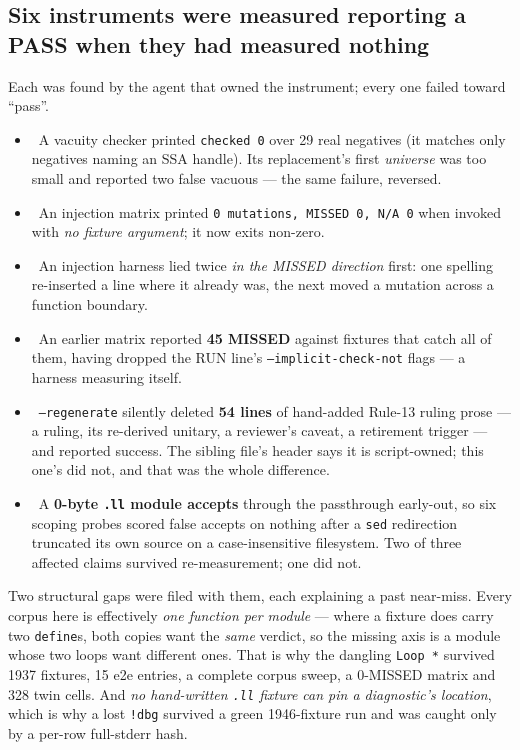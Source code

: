 \subsection*{Six instruments were measured reporting a PASS when they had measured nothing}
Each was found by the agent that owned the instrument; every one failed toward ``pass''.
\begin{itemize}
  \item \fdoc\ A vacuity checker printed \texttt{checked 0} over 29 real negatives (it matches only
    negatives naming an SSA handle). Its replacement's first \emph{universe} was too small and reported two
    false vacuous --- the same failure, reversed.
  \item \fdoc\ An injection matrix printed \texttt{0 mutations, MISSED 0, N/A 0} when invoked with \emph{no
    fixture argument}; it now exits non-zero.
  \item \fdoc\ An injection harness lied twice \emph{in the MISSED direction} first: one spelling
    re-inserted a line where it already was, the next moved a mutation across a function boundary.
  \item \fdoc\ An earlier matrix reported \textbf{45 MISSED} against fixtures that catch all of them,
    having dropped the RUN line's \texttt{--implicit-check-not} flags --- a harness measuring itself.
  \item \fdoc\ \texttt{--regenerate} silently deleted \textbf{54 lines} of hand-added Rule-13 ruling prose
    --- a ruling, its re-derived unitary, a reviewer's caveat, a retirement trigger --- and reported
    success. The sibling file's header says it is script-owned; this one's did not, and that was the whole
    difference.
  \item \fdoc\ A \textbf{0-byte \texttt{.ll} module accepts} through the passthrough early-out, so six
    scoping probes scored false accepts on nothing after a \texttt{sed} redirection truncated its own source
    on a case-insensitive filesystem. Two of three affected claims survived re-measurement; one did not.
\end{itemize}
Two structural gaps were filed with them, each explaining a past near-miss. Every corpus here is
effectively \emph{one function per module} --- where a fixture does carry two \texttt{define}s, both copies
want the \emph{same} verdict, so the missing axis is a module whose two loops want different ones. That is
why the dangling \texttt{Loop *} survived 1937 fixtures, 15 e2e entries, a complete corpus sweep, a 0-MISSED
matrix and 328 twin cells. And \emph{no hand-written \texttt{.ll} fixture can pin a diagnostic's location},
which is why a lost \texttt{!dbg} survived a green 1946-fixture run and was caught only by a per-row
full-stderr hash.

